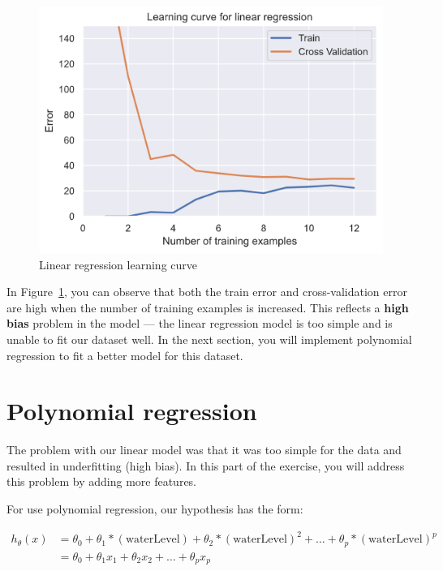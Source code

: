 \documentclass[12pt]{article}
\begin{document}
\begin{figure}[h!]
  \centering
  \includegraphics[scale=0.6]{learningcurve.png}
  \caption{Linear regression learning curve}
  \label{fig:learningcurve}
\end{figure}

In Figure~\ref{fig:learningcurve}, you can observe that both the train error and cross-validation error are high when the number of training examples is increased. This reflects a \textbf{high bias} problem in the model --- the linear regression model is too simple and is unable to fit our dataset well. In the next section, you will implement polynomial regression to fit a better model for this dataset.

\section{Polynomial regression}

The problem with our linear model was that it was too simple for the data and resulted in underfitting (high bias). In this part of the exercise, you will address this problem by adding more features.

For use polynomial regression, our hypothesis has the form:

\begin{align}
  h_\theta(x) & = \theta_0 + \theta_1 * (\text{waterLevel}) + \theta_2 * (\text{waterLevel})^2 + \dots + \theta_p * (\text{waterLevel})^p \\
   & = \theta_0 + \theta_1 x_1 + \theta_2 x_2 + \dots + \theta_p x_p 
\end{align}
\end{document}
